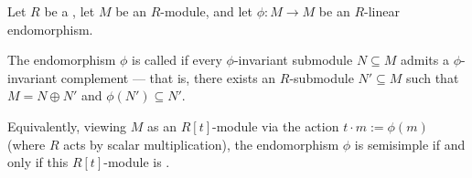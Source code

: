 \begin{definition} \label{definition:semisimple_endomorphism_of_a_module_over_a_commutative_ring}
Let $R$ be a , let $M$ be an $R$-module, and let $\phi : M \to M$ be an $R$-linear endomorphism.

The endomorphism $\phi$ is called  if every $\phi$-invariant submodule $N \subseteq M$ admits a $\phi$-invariant complement — that is, there exists an $R$-submodule $N' \subseteq M$ such that $M = N \oplus N'$ and $\phi(N') \subseteq N'$.

Equivalently, viewing $M$ as an $R[t]$-module via the action $t \cdot m := \phi(m)$ (where $R$ acts by scalar multiplication), the endomorphism $\phi$ is semisimple if and only if this $R[t]$-module is .
\end{definition}
